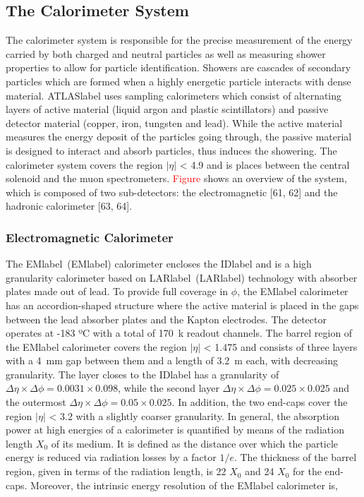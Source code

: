 
\subsection{The Calorimeter System}

The calorimeter system is responsible for the precise measurement of the energy carried by both charged and neutral particles as well as measuring shower properties to allow for particle identification. Showers are cascades of secondary particles which are formed when a highly energetic particle interacts with dense material. \acrshort{ATLASlabel} uses sampling calorimeters which consist of alternating layers of active material (liquid argon and plastic scintillators) and passive detector material (copper, iron, tungsten and lead). While the active material measures the energy deposit of the particles going through, the passive material is designed to interact and absorb particles, thus induces the showering. The calorimeter system covers the region $|\eta|$ < 4.9 and is places between the central solenoid and the muon spectrometers. \textcolor{red}{Figure} shows an overview of the system, which is composed of two sub-detectors: the electromagnetic [61, 62] and the hadronic calorimeter [63, 64]. 


\subsubsection*{Electromagnetic Calorimeter}

The \acrlong{EMlabel}~(\acrshort{EMlabel}) calorimeter encloses the \acrshort{IDlabel} and is a high granularity calorimeter based on \acrlong{LARlabel}~(\acrshort{LARlabel}) technology with absorber plates made out of lead. To provide full coverage in $\phi$, the \acrshort{EMlabel} calorimeter has an accordion-shaped structure where the active material is placed in the gaps between the lead absorber plates and the Kapton electrodes. The detector operates at -183 ºC with a total of 170~k readout channels. The barrel region of the \acrshort{EMlabel} calorimeter covers the region $|\eta|$ < 1.475 and consists of three layers with a 4~mm gap between them and a length of 3.2~m each, with decreasing granularity. The layer closes to the \acrshort{IDlabel} has a granularity of $\Delta\eta\times\Delta\phi= 0.0031\times 0.098$, while the second layer $\Delta\eta\times\Delta\phi= 0.025\times 0.025$ and the outermost $\Delta\eta\times\Delta\phi= 0.05\times 0.025$. In addition, the two end-caps cover the region $|\eta|$ < 3.2 with a slightly coarser granularity. In general, the absorption power at high energies of a calorimeter is quantified by means of the radiation length $X_0$ of its medium. It is defined as the distance over which the particle energy is reduced via radiation losses by a factor $1/e$. The thickness of the barrel region, given in terms of the radiation length, is 22 $X_0$ and 24 $X_0$ for the end-caps. Moreover, the intrinsic energy resolution of the \acrshort{EMlabel} calorimeter is,

